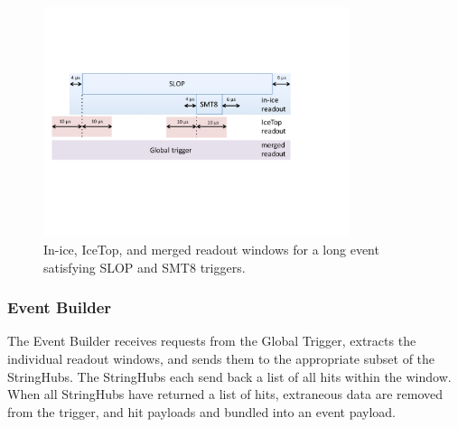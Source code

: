 \begin{figure}[!ht]
 \centering
 \includegraphics[width=0.8\textwidth]{graphics/online/trigger/trigger_readout}
 \caption{In-ice, IceTop, and merged readout windows for a long event
   satisfying SLOP and SMT8 triggers.}
 \label{fig:trigger_readout}
\end{figure}


\subsubsection{\label{sect:online:evbuilder}Event Builder}

The Event Builder receives requests from the Global Trigger, extracts the
individual readout windows, and sends them to the appropriate subset of the
StringHubs.  The StringHubs each send back a list of all hits within the
window.  When all StringHubs have returned a list of hits, extraneous data are
removed from the trigger, and hit payloads and bundled into an event payload.

